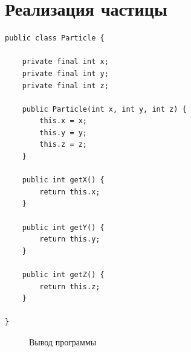 \documentclass[a4paper, 14pt]{extarticle}
\begin{document}
\section{Реализация частицы}
{\scriptsize
\begin{verbatim}
public class Particle {

    private final int x;
    private final int y;
    private final int z;

    public Particle(int x, int y, int z) {
        this.x = x;
        this.y = y;
        this.z = z;
    }

    public int getX() {
        return this.x;
    }

    public int getY() {
        return this.y;
    }

    public int getZ() {
        return this.z;
    }

}
\end{verbatim}
}

\begin{figure}[h] 
\caption{Вывод программы} 
\label{fig:image} 
\end{figure}
\end{document}
